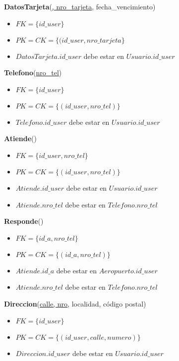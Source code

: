 \vspace*{0.1cm}
\noindent
\textbf{DatosTarjeta}(\underline{, nro\_tarjeta}, 
    fecha\_vencimiento)
\begin{itemize}[noitemsep]
	\item $FK = \{id\_user\}$
	\item $PK = CK = \{(id\_user, nro\_tarjeta\}$
	\item $DatosTarjeta.id\_user$ debe estar en $Usuario.id\_user$
\end{itemize}


\noindent
\textbf{Telefono}(\underline{nro\_tel})
\begin{itemize}[noitemsep]
    \item $FK = \{id\_user\}$
    \item $PK = CK = \{(id\_user, nro\_tel)\}$
    \item $Telefono.id\_user$ debe estar en $Usuario.id\_user$
\end{itemize}

\vspace*{0.1cm}
\noindent
\textbf{Atiende}(\underline{})
\begin{itemize}[noitemsep]
	\item $FK = \{id\_user, nro\_tel\}$
	\item $PK = CK = \{(id\_user, nro\_tel)\}$
	\item $Atiende.id\_user$ debe estar en $Usuario.id\_user$
	\item $Atiende.nro\_tel$ debe estar en $Telefono.nro\_tel$
\end{itemize}

\newpage
\vspace*{0.1cm}
\noindent
\textbf{Responde}(\underline{})
\begin{itemize}[noitemsep]
    \item $FK = \{id\_a, nro\_tel\}$
    \item $PK = CK = \{(id\_a, nro\_tel)\}$
    \item $Atiende.id\_a$ debe estar en $Aeropuerto.id\_user$
    \item $Atiende.nro\_tel$ debe estar en $Telefono.nro\_tel$
\end{itemize}


\vspace*{0.1cm}
\noindent
\textbf{Direccion}(\underline{calle, nro}, 
                    localidad, código postal)
\begin{itemize}[noitemsep]
    \item $FK = \{id\_user\}$
    \item $PK = CK = \{(id\_user, calle, numero)\}$
    \item $Direccion.id\_user$ debe estar en $Usuario.id\_user$
\end{itemize}


